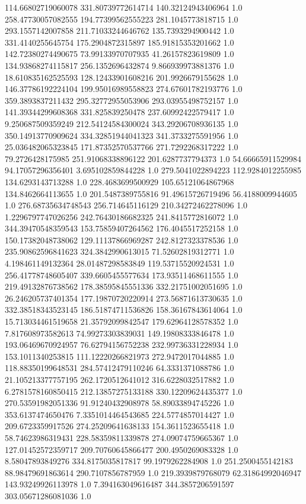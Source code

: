114.66802719060078	331.80739772614714	140.32124943406964	1.0
258.47730057082555	194.77399562555223	281.1045773818715	1.0
293.1557142007858	211.71033244646762	135.7393294900442	1.0
331.4140255645754	175.2904872315897	185.91815353201662	1.0
142.72380274490675	73.99133970707935	41.26157823619809	1.0
134.93868274115817	256.1352696432874	9.866939973881376	1.0
18.610835162525593	128.12433901608216	201.9926679155628	1.0
146.37786192224104	199.95016989558823	274.67601782193776	1.0
359.3893837211432	295.32772955053906	293.03955498752157	1.0
141.39344299608368	331.825839250478	237.60992422579417	1.0
9.250687509359249	212.54124584300024	343.29206708936135	1.0
350.14913770909624	334.32851944041323	341.3733275591956	1.0
25.036482065323845	171.87352570537766	271.7292268317222	1.0
79.2726428175985	251.91068338896122	201.6287737794373	1.0
54.66665911529984	94.17057296356401	3.695102859844228	1.0
279.5041022894223	112.9284012255985	134.6293143713288	1.0
228.4683699500929	105.65121064867968	134.8462664113655	1.0
201.5487389755816	91.49615726719496	56.4188009944605	1.0
276.68735634748543	256.714645116129	210.34272462278096	1.0
1.2296797747026256	242.76430186682325	241.8415772816072	1.0
344.39470548359543	153.75859407264562	176.4045517252158	1.0
150.17382048738062	129.11137866969287	242.8127323378536	1.0
235.90862596841623	324.3842990613015	71.52602819312771	1.0
4.198461149132364	28.01487298583849	119.53715520924531	1.0
256.41778748605407	339.6605455577634	173.93511468611555	1.0
219.49132876738562	178.38595845551336	332.21751002051695	1.0
26.246205737401354	177.19870720220914	273.56871613730635	1.0
332.38518343523145	186.51874711536826	158.36167843614064	1.0
15.713034461519658	21.35792099842547	179.62964128578352	1.0
7.817608973582613	74.99273303839031	149.19808333846478	1.0
193.06469670924957	76.62794156752238	232.99736331228934	1.0
153.1011340253815	111.12220266821973	272.9472017044885	1.0
118.88350199648531	284.57412479110246	64.3331371088786	1.0
21.105213377757195	262.1720512641012	316.6228032517882	1.0
6.2781578160850415	212.13857275133188	330.12209624435377	1.0
270.53591982051336	91.91240432908978	58.89033894745226	1.0
353.6137474650476	7.3351014464543685	224.5774857014427	1.0
209.6723359917526	274.25209641638133	154.3611523655418	1.0
58.74623986319431	228.58359811339878	274.09074759665367	1.0
127.01452572359717	209.70760645866477	200.4950269083328	1.0
8.58047893849276	334.8175035817817	99.1979262284908	1.0
251.2500455142183	88.98479691863614	290.7107856787959	1.0
219.3939879768079	62.31864992046947	143.93249926113978	1.0
7.394163049616487	344.3857206591597	303.05671286081036	1.0
